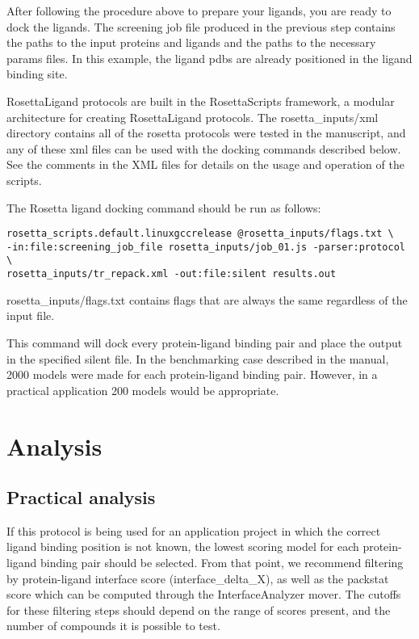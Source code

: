 After following the procedure above to prepare your ligands, you are ready to dock the ligands.
The screening job file produced in the previous step contains the paths to the input proteins and ligands and the paths to the necessary params files.
In this example, the ligand pdbs are already positioned in the ligand binding site.

RosettaLigand protocols are built in the RosettaScripts framework, a modular architecture for creating RosettaLigand protocols.
The rosetta\_inputs/xml directory contains all of the rosetta protocols were tested in the manuscript, and any of these xml files can be used with the docking commands described below. 
See the comments in the XML files for details on the usage and operation of the scripts. 

The Rosetta ligand docking command should be run as follows:

\begin{verbatim}
rosetta_scripts.default.linuxgccrelease @rosetta_inputs/flags.txt \
-in:file:screening_job_file rosetta_inputs/job_01.js -parser:protocol \
rosetta_inputs/tr_repack.xml -out:file:silent results.out
\end{verbatim}

rosetta\_inputs/flags.txt contains flags that are always the same regardless of the input file.

This command will dock every protein-ligand binding pair and place the output in the specified silent file.
In the benchmarking case described in the manual, 2000 models were made for each protein-ligand binding pair. 
However, in a practical application 200 models would be appropriate.

\section{Analysis}

\subsection{Practical analysis}

If this protocol is being used for an application project in which the correct ligand binding position is not known, the lowest scoring model for each protein-ligand binding pair should be selected.
From that point, we recommend filtering by protein-ligand interface score (interface\_delta\_X), as well as the packstat score\citep{Sheffler:2009bd} which can be computed through the InterfaceAnalyzer mover.
The cutoffs for these filtering steps should depend on the range of scores present, and the number of compounds it is possible to test.

